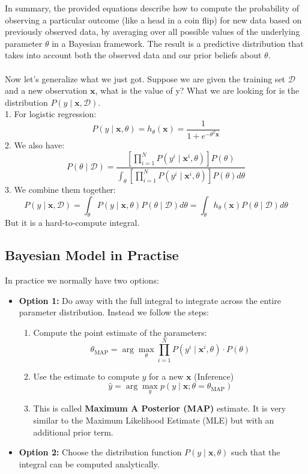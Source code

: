 \documentclass{article}
\begin{document}
In summary, the provided equations describe how to compute the probability of observing a particular outcome (like a head in a coin flip) for new data based on previously observed data, by averaging over all possible values of the underlying parameter \( \theta \) in a Bayesian framework. The result is a predictive distribution that takes into account both the observed data and our prior beliefs about \( \theta \). \\
 \\
 Now let's generalize what we just got. Suppose we are given the training set \( \mathcal{D}\)and a new observation \(\bm{x}\), what is the value of y? What we are looking for is the distribution \(P(y \mid \bm{x},\mathcal{D})\).\\ 
 1. For logistic regression:
 \[P(y \mid \bm{x},\theta)=h_{\theta}(\bm{x})=\frac{1}{1+e^{-\theta^{T}\bm{x}}} \]
 2. We also have:
 \[ P(\theta \mid \mathcal{D}) = \frac{ \left[ \prod_{i=1}^{N}P( y^i \mid \bm{x}^i ,\theta) \right] P(\theta)}{\int_{\theta} \left[ \prod_{i=1}^{N}P( y^i \mid \bm{x}^i ,\theta) \right]P(\theta)d\theta}\]
 3. We combine them together:
 \[ P(y \mid \bm{x},\mathcal{D}) = \int_{\theta} P(y \mid \bm{x},\theta)P(\theta \mid \mathcal{D}) d\theta = \int_{\theta} h_{\theta}(\bm{x})P(\theta \mid \mathcal{D}) d\theta \]
 But it is a hard-to-compute integral.
 \subsection{Bayesian Model in Practise}
In practice we normally have two options:
\begin{itemize}
    \item \textbf{Option 1: }Do away with the full integral to integrate across the entire parameter distribution. Instead we follow the steps:
    \begin{enumerate}
        \item Compute the point estimate of the parameters:
        \[ \theta_{\text{MAP}} = \arg \max_\theta \prod_{i=1}^{N}P(y^i \mid \bm{x}^i, \theta) \cdot P(\theta)\]
        \item Use the estimate to compute $y$ for a new $\bm{x}$ (Inference)
        \[ \hat{y} = \arg \max_y p(y \mid \bm{x}; \theta = \theta_{\text{MAP}})\]
        \item This is called \textbf{Maximum A Posterior (MAP)} estimate. It is very similar to the Maximum Likelihood Estimate (MLE) but with an additional prior term.
    \end{enumerate}
    \item \textbf{Option 2:} Choose the distribution function $P(y \mid \bm{x},\theta)$ such that the integral can be computed analytically.
\end{itemize}
\end{document}
